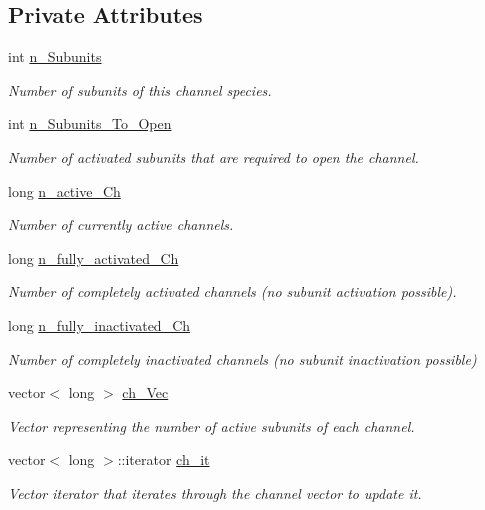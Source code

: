 \subsection*{Private Attributes}
\begin{DoxyCompactItemize}
\item 
int \hyperlink{classnw_1_1_channel___spc_a2b63ef7e5147046919cf96060b57e078}{n\+\_\+\+Subunits}
\begin{DoxyCompactList}\small\item\em Number of subunits of this channel species. \end{DoxyCompactList}\item 
int \hyperlink{classnw_1_1_channel___spc_a52e6e8aae67ebfb6cec1b79e7f125542}{n\+\_\+\+Subunits\+\_\+\+To\+\_\+\+Open}
\begin{DoxyCompactList}\small\item\em Number of activated subunits that are required to open the channel. \end{DoxyCompactList}\item 
long \hyperlink{classnw_1_1_channel___spc_a67fd1b83563c30ec86802bdab420c95d}{n\+\_\+active\+\_\+\+Ch}
\begin{DoxyCompactList}\small\item\em Number of currently active channels. \end{DoxyCompactList}\item 
long \hyperlink{classnw_1_1_channel___spc_ac6ae04b799c751bb61918b4ab163ce85}{n\+\_\+fully\+\_\+activated\+\_\+\+Ch}
\begin{DoxyCompactList}\small\item\em Number of completely activated channels (no subunit activation possible). \end{DoxyCompactList}\item 
long \hyperlink{classnw_1_1_channel___spc_a35afc71aa0eeb5b1e4a2089a5c1f65ae}{n\+\_\+fully\+\_\+inactivated\+\_\+\+Ch}
\begin{DoxyCompactList}\small\item\em Number of completely inactivated channels (no subunit inactivation possible) \end{DoxyCompactList}\item 
vector$<$ long $>$ \hyperlink{classnw_1_1_channel___spc_aca3ddf4eba759eeeb835bba168795a11}{ch\+\_\+\+Vec}
\begin{DoxyCompactList}\small\item\em Vector representing the number of active subunits of each channel. \end{DoxyCompactList}\item 
vector$<$ long $>$\+::iterator \hyperlink{classnw_1_1_channel___spc_a025013604067ea03dce585fb5a785408}{ch\+\_\+it}
\begin{DoxyCompactList}\small\item\em Vector iterator that iterates through the channel vector to update it. \end{DoxyCompactList}\end{DoxyCompactItemize}
